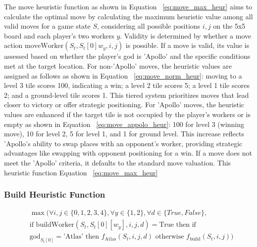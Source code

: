 \documentclass{telkomnika}
\begin{document}
The move heuristic function as shown in Equation ~\ref{eq:move_max_heur} aims to calculate the optimal move by calculating the maximum heuristic value among all valid moves for a game state \( S \), considering all possible positions \( i, j \) on the 5x5 board and each player's two workers \( y \). Validity is determined by whether a move action \( \text{moveWorker}(S_t, S_t[0]w_y, i, j) \) is possible. If a move is valid, its value is assessed based on whether the player's god is 'Apollo' and the specific conditions met at the target location. For non-'Apollo' moves, the heuristic values are assigned as follows as shown in Equation ~\ref{eq:move_norm_heur}: moving to a level 3 tile scores 100, indicating a win; a level 2 tile scores 5; a level 1 tile scores 2; and a ground-level tile scores 1. This tiered system prioritizes moves that lead closer to victory or offer strategic positioning. For 'Apollo' moves, the heuristic values are enhanced if the target tile is not occupied by the player's workers or is empty as shown in Equation ~\ref{eq:move_appolo_heur}: 100 for level 3 (winning move), 10 for level 2, 5 for level 1, and 1 for ground level. This increase reflects 'Apollo's ability to swap places with an opponent's worker, providing strategic advantages like swapping with opponent positioning for a win. If a move does not meet the 'Apollo' criteria, it defaults to the standard move valuation. This heuristic function Equation ~\ref{eq:move_max_heur} 

\subsubsection {Build Heuristic Function}
\begin{equation}
 \begin{aligned}
    &\max(\forall i,j \in \{0, 1, 2, 3, 4\}, \forall y \in \{1, 2\}, \forall d \in \{True, False\},\\
    &\text{if } \text{buildWorker}(S_t, S_t[0][w_y], i, j, d) = \text{True} \text{ then if } \\
    &\text{god}_{S_t[0]} = \text{'Atlas'} \text{ then } f_{\text{Atlas}}(S_t, i, j,d) \text{ otherwise } f_{\text{build}}(S_t, i, j))
 \end{aligned}
\label{eq:build_max_heur}
\end{equation}
\end{document}
